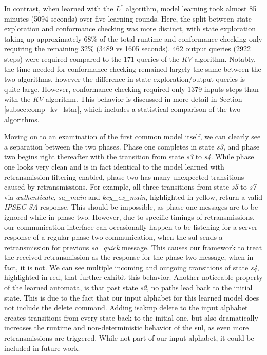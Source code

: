 In contrast, when learned with the $L^*$ algorithm, model learning took almost 85 minutes (5094 seconds) over five learning rounds. Here, the split between state exploration and conformance checking was more distinct, with state exploration taking up approximately 68\% of the total runtime and conformance checking only requiring the remaining 32\% (3489 vs 1605 seconds). 462 output queries (2922 steps) were required compared to the 171 queries of the $KV$ algorithm. Notably, the time needed for conformance checking remained largely the same between the two algorithms, however the difference in state exploration/output queries is quite large. However, conformance checking required only 1379 inputs steps than with the $KV$ algorithm. This behavior is discussed in more detail in Section \ref{subsec:comp_kv_lstar}, which includes a statistical comparison of the two algorithms.

Moving on to an examination of the first common model itself, we can clearly see a separation between the two phases. Phase one completes in state \emph{s3}, and phase two begins right thereafter with the transition from state \emph{s3} to \emph{s4}. While phase one looks very clean and is in fact identical to the model learned with retransmission-filtering enabled, phase two has many unexpected transitions caused by retransmissions. For example, all three transitions from state \emph{s5} to \emph{s7} via \emph{authenticate}, \emph{sa\_main} and \emph{key\_ex\_main}, highlighted in yellow, return a valid \emph{IPSEC SA} response. This should be impossible, as phase one messages are to be ignored while in phase two. However, due to specific timings of retransmissions, our communication interface can occasionally happen to be listening for a server response of a regular phase two communication, when the \ac{sul} sends a retransmission for previous \emph{sa\_quick} message. This causes our framework to treat the received retransmission as the response for the phase two message, when in fact, it is not. We can see multiple incoming and outgoing transitions of state \emph{s4}, highlighted in red, that further exhibit this behavior.
Another noticeable property of the learned automata, is that past state \emph{s2}, no paths lead back to the initial state. This is due to the fact that our input alphabet for this learned model does not include the delete command. Adding \ac{isakmp} delete to the input alphabet creates transitions from every state back to the initial one, but also dramatically increases the runtime and non-deterministic behavior of the \ac{sul}, as even more retransmissions are triggered. While not part of our input alphabet, it could be included in future work.


